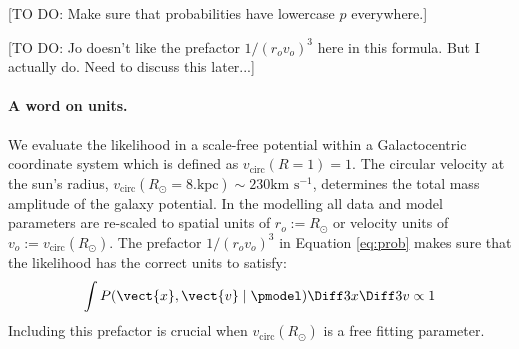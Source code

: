 [TO DO: Make sure that probabilities have lowercase $p$ everywhere.]

[TO DO: Jo doesn't like the prefactor $1/(r_o v_o)^3$ here in this formula. But I actually do. Need to discuss this later...]


\paragraph{A word on units.} We evaluate the likelihood in a scale-free potential within a Galactocentric coordinate system which is defined as $v_\text{circ}(R = 1) = 1$. The circular velocity at the sun's radius, $v_\text{circ}(R_\odot = 8. \text{kpc}) \sim 230 \text{km s$^{-1}$}$, determines the total mass amplitude of the galaxy potential. In the modelling all data and model parameters are re-scaled to spatial units of $r_o := R_\odot$ or velocity units of $v_o := v_\text{circ}(R_\odot )$. The prefactor $1/\left(r_o v_o\right)^3$ in Equation \ref{eq:prob} makes sure that the likelihood has the correct units to satisfy:
\begin{eqnarray*}
\int P(\vect{x},\vect{v} \mid \pmodel) \Diff 3 x \Diff 3 v \propto 1
\end{eqnarray*} 
Including this prefactor is crucial when $v_\text{circ}(R_\odot )$ is a free fitting parameter.

